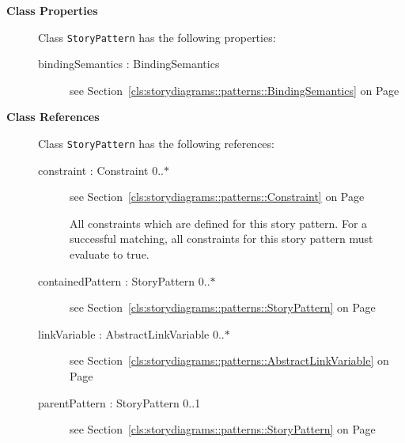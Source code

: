 \begin{description}

	\item[\textbf{Class Properties}] Class \texttt{StoryPattern} has the following properties:
	\begin{description}
\item[bindingSemantics : BindingSemantics 	]
see Section~\ref{cls:storydiagrams::patterns::BindingSemantics} on Page~\pageref{cls:storydiagrams::patterns::BindingSemantics}
\hspace{\fill}
\nopagebreak


	
	\end{description}
	
	\item[\textbf{Class References}] Class \texttt{StoryPattern} has the following references:
	\begin{description}
\item[constraint : Constraint 			0..$*$]
see Section~\ref{cls:storydiagrams::patterns::Constraint} on Page~\pageref{cls:storydiagrams::patterns::Constraint}
\hspace{\fill}
\nopagebreak


	
			
All constraints which are defined for this story pattern. For a successful matching, all constraints for this story pattern must evaluate to true.	
		
	
\item[containedPattern : StoryPattern 			0..$*$]
see Section~\ref{cls:storydiagrams::patterns::StoryPattern} on Page~\pageref{cls:storydiagrams::patterns::StoryPattern}
\hspace{\fill}
\nopagebreak


	
\item[linkVariable : AbstractLinkVariable 			0..$*$]
see Section~\ref{cls:storydiagrams::patterns::AbstractLinkVariable} on Page~\pageref{cls:storydiagrams::patterns::AbstractLinkVariable}
\hspace{\fill}
\nopagebreak


	
\item[parentPattern : StoryPattern 			0..1]
see Section~\ref{cls:storydiagrams::patterns::StoryPattern} on Page~\pageref{cls:storydiagrams::patterns::StoryPattern}
\hspace{\fill}
\nopagebreak



\end{description}
\end{description}
